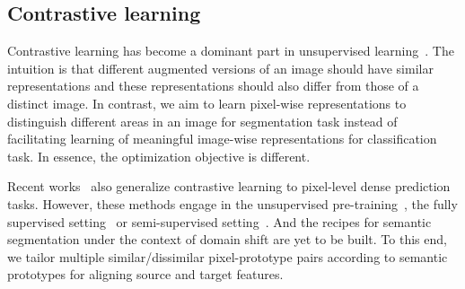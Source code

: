 \documentclass[runningheads]{llncs}
\begin{document}
\subsection{Contrastive learning} Contrastive learning has become a dominant part in unsupervised learning~\cite{chen2020contrastive,he2020momentum,park2020contrastive,oord2018infoNCE,radford2021learning}. The intuition is that different augmented versions of an image should have similar representations and these representations should also differ from those of a distinct image. In contrast, we aim to learn pixel-wise representations to distinguish different areas in an image for segmentation task instead of facilitating learning of meaningful image-wise representations for classification task.  In essence, the optimization objective is different.

Recent works~\cite{alonso2021semi,xie2020contrastive_dense,wang2020contrastive_dense,kim2021learning,wenguan_exploring_ICCV} also generalize contrastive learning to pixel-level dense prediction tasks. However, these methods engage in the unsupervised pre-training~\cite{xie2020contrastive_dense}, the fully supervised setting~\cite{wenguan_exploring_ICCV} or semi-supervised setting~\cite{alonso2021semi}. And the recipes for semantic segmentation under the context of domain shift are yet to be built. To this end, we tailor multiple similar/dissimilar pixel-prototype pairs according to semantic prototypes for aligning source and target features. 
\end{document}
